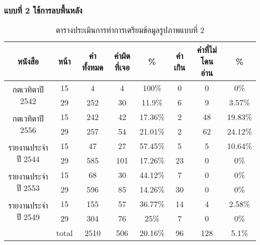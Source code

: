 \subsubsection{แบบที่ 2 ใช้การลบพื้นหลัง}

\begin{table}[H]
    \caption{ตารางประเมินการทำการเตรียมข้อมูลรูปภาพแบบที่ 2}\label{tbl:imagep2}
        \begin{tabular}{|c|c|c|c|c|c|c|c|}
            \hline
            หนังสือ                             & หน้า                       & คำทั้งหมด & คำผิดที่เจอ & \%    & คำเกิน & คำที่ไม่โดนอ่าน & \%    \\ \hline
            \multirow{2}{*}{กตเวทิตาปี 2542}    & 15                         & 4         & 4           & 100\%   & 0      & 0               & 0\%     \\ \cline{2-8} 
                                                & 29                         & 252       & 30          & 11.9\%  & 6      & 9               & 3.57\%  \\ \hline
            \multirow{2}{*}{กตเวทิตาปี 2556}    & 15                         & 242       & 42          & 17.36\% & 2      & 48              & 19.83\% \\ \cline{2-8} 
                                                & 29                         & 257       & 54          & 21.01\% & 2      & 62              & 24.12\% \\ \hline
            \multirow{2}{*}{รายงานประจำปี 2544} & 15                         & 47        & 27          & 57.45\% & 5      & 5               & 10.64\% \\ \cline{2-8} 
                                                & 29                         & 585       & 101         & 17.26\% & 23     & 0               & 0\%     \\ \hline
            \multirow{2}{*}{รายงานประจำปี 2553} & 15                         & 68        & 30          & 44.12\% & 7      & 0               & 0\%     \\ \cline{2-8} 
                                                & 29                         & 596       & 85          & 14.26\% & 30     & 0               & 0\%     \\ \hline
            \multirow{2}{*}{รายงานประจำปี 2549} & 15                         & 155       & 57          & 36.77\% & 14     & 4               & 2.58\%  \\ \cline{2-8} 
                                                & 29                         & 304       & 76          & 25\%    & 7      & 0               & 0\%     \\ \hline
            \multicolumn{1}{|l|}{}              & \multicolumn{1}{l|}{total} & 2510      & 506         & 20.16\% & 96     & 128             & 5.1\%   \\ \hline
            \end{tabular}
            \end{table}

